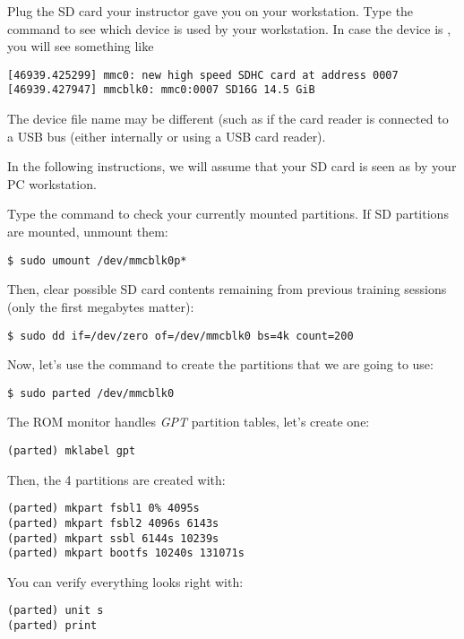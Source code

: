 Plug the SD card your instructor gave you on your workstation. Type
the  command to see which device is used by your
workstation. In case the device is , you will see
something like

\begin{verbatim}
[46939.425299] mmc0: new high speed SDHC card at address 0007
[46939.427947] mmcblk0: mmc0:0007 SD16G 14.5 GiB
\end{verbatim}

The device file name may be different (such as 
if the card reader is connected to a USB bus (either internally
or using a USB card reader).

In the following instructions, we will assume that your SD card is
seen as  by your PC workstation.

Type the  command to check your currently mounted
partitions. If SD partitions are mounted, unmount them:

\begin{verbatim}
$ sudo umount /dev/mmcblk0p*
\end{verbatim}

Then, clear possible SD card contents remaining from previous
training sessions (only the first megabytes matter):

\begin{verbatim}
$ sudo dd if=/dev/zero of=/dev/mmcblk0 bs=4k count=200
\end{verbatim}

Now, let's use the  command to create the partitions that
we are going to use:

\begin{verbatim}
$ sudo parted /dev/mmcblk0
\end{verbatim}

The ROM monitor handles {\em GPT} partition tables, let's create one:

\begin{verbatim}
(parted) mklabel gpt
\end{verbatim}

Then, the 4 partitions are created with:
\begin{verbatim}
(parted) mkpart fsbl1 0% 4095s
(parted) mkpart fsbl2 4096s 6143s
(parted) mkpart ssbl 6144s 10239s
(parted) mkpart bootfs 10240s 131071s
\end{verbatim}

You can verify everything looks right with:

\begin{verbatim}
(parted) unit s
(parted) print
\end{verbatim}

